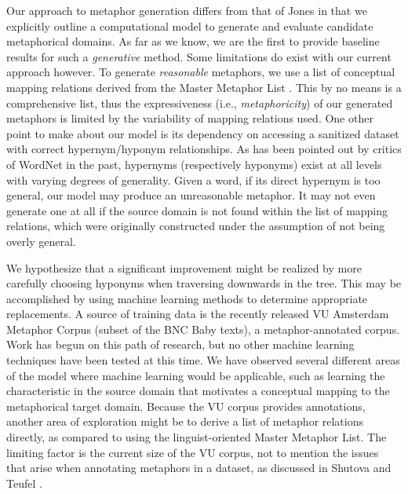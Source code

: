 \documentclass[12pt]{article}
\begin{document}
Our approach to metaphor generation differs from that of Jones \cite{jones92} in that we explicitly outline a computational model to generate and evaluate candidate metaphorical domains. As far as we know, we are the first to provide baseline results for such a \emph{generative} method. Some limitations do exist with our current approach however. To generate \emph{reasonable} metaphors, we use a list of conceptual mapping relations derived from the Master Metaphor List \cite{lakoff89}. This by no means is a comprehensive list, thus the expressiveness (i.e., \emph{metaphoricity}) of our generated metaphors is limited by the variability of mapping relations used. One other point to make about our model is its dependency on accessing a sanitized dataset with correct hypernym/hyponym relationships. As has been pointed out by critics of WordNet in the past, hypernyms (respectively hyponyms) exist at all levels with varying degrees of generality. Given a word, if its direct hypernym is too general, our model may produce an unreasonable metaphor. It may not even generate one at all if the source domain is not found within the list of mapping relations, which were originally constructed under the assumption of not being overly general.

We hypothesize that a significant improvement might be realized by more carefully choosing hyponyms when traversing downwards in the tree.  This may be accomplished by using machine learning methods to determine appropriate replacements. A source of training data is the recently released VU Amsterdam Metaphor Corpus \cite{steen12} (subset of the BNC Baby texts), a metaphor-annotated corpus. Work has begun on this path of research, but no other machine learning techniques have been tested at this time. We have observed several different areas of the model where machine learning would be applicable, such as learning the characteristic in the source domain that motivates a conceptual mapping to the metaphorical target domain. Because the VU corpus provides annotations, another area of exploration might be to derive a list of metaphor relations directly, as compared to using the linguist-oriented Master Metaphor List.  The limiting factor is the current size of the VU corpus, not to mention the issues that arise when annotating metaphors in a dataset, as discussed in Shutova and Teufel \cite{shutova103}.
\end{document}
